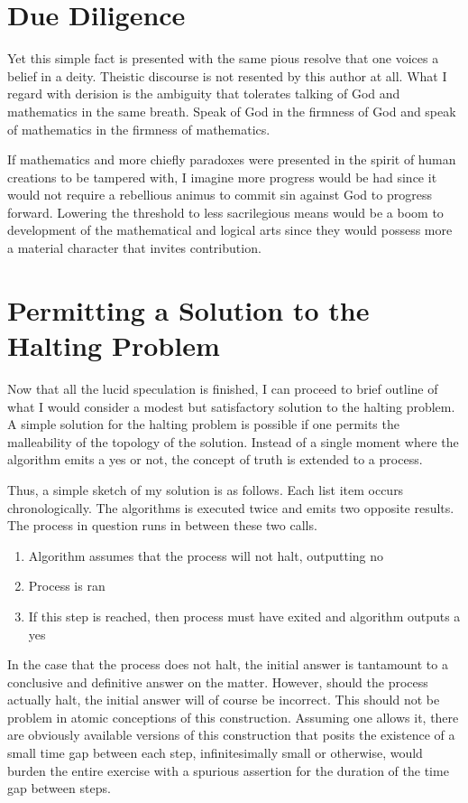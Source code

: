 \documentclass[11pt]{article}
\begin{document}
\section{Due Diligence}
\label{sec:org9735a11}

Yet this simple fact is presented with the same pious resolve that one voices
a belief in a deity. Theistic discourse is not resented by this author at all.
What I regard with derision is the ambiguity that tolerates talking of God and
mathematics in the same breath. Speak of God in the firmness of God and speak
of mathematics in the firmness of mathematics.

If mathematics and more chiefly paradoxes were presented in the spirit of
human creations to be tampered with, I imagine more progress would be had
since it would not require a rebellious animus to commit sin against God to
progress forward. Lowering the threshold to less sacrilegious means would be a
boom to development of the mathematical and logical arts since they would
possess more a material character that invites contribution.

\section{Permitting a Solution to the Halting Problem}
\label{sec:org9c58b1f}

Now that all the lucid speculation is finished, I can proceed to brief outline
of what I would consider a modest but satisfactory solution to the halting
problem. A simple solution for the halting problem is possible if one permits
the malleability of the topology of the solution. Instead of a single moment
where the algorithm emits a yes or not, the concept of truth is extended to a
process.

Thus, a simple sketch of my solution is as follows. Each list item occurs
chronologically. The algorithms is executed twice and emits two opposite
results. The process in question runs in between these two calls.

\begin{enumerate}
\item Algorithm assumes that the process will not halt, outputting no
\item Process is ran
\item If this step is reached, then process must have exited and algorithm outputs a yes
\end{enumerate}

In the case that the process does not halt, the initial answer is tantamount
to a conclusive and definitive answer on the matter. However, should the
process actually halt, the initial answer will of course be incorrect. This
should not be problem in atomic conceptions of this construction. Assuming one
allows it, there are obviously available versions of this construction that
posits the existence of a small time gap between each step, infinitesimally
small or otherwise, would burden the entire exercise with a spurious assertion
for the duration of the time gap between steps.
\end{document}
